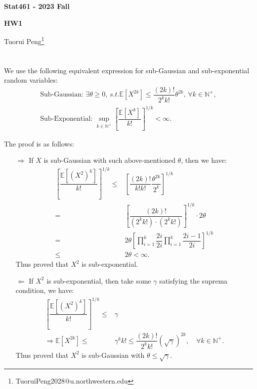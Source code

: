 \documentclass[11pt,a4paper]{ctexart}
\numberwithin{equation}{section}%
\begin{document}
\begin{center}\thispagestyle{plain}

{\LARGE\textbf{Stat461 - 2023 Fall}}

{\Large\textbf{HW1}}

Tuorui Peng\footnote{TuoruiPeng2028@u.northwestern.edu}
\end{center}

\thispagestyle{myheadings}
\pagestyle{myheadings}





  


\section{}
\subsection{}
We use the following equivalent expression for sub-Gaussian and sub-exponential random variables:
\begin{align*}
    \text{Sub-Gaussian: }\exists \theta \geq 0,\,s.t. \mathbb{E}\left[ X^{2k} \right] \leq \dfrac{ (2k)! }{ 2^kk! } \theta^{2k},\, \forall k \in \mathbb{N}^+,\\
    \text{Sub-Exponential: }\mathop{ \sup }\limits_{k\in\mathbb{N}^+} \left[\dfrac{ \mathbb{E}\left[ X^k  \right]  }{ k! } \right]^{1/k} < \infty .
\end{align*}

The proof is as follows:
\begin{itemize}[topsep=2pt,itemsep=0pt]
    \item[$ \Rightarrow $] If $ X $ is sub-Gaussian with such above-mentioned $ \theta $, then we have:
    \begin{align*}
        \left[\dfrac{ \mathbb{E}\left[ (X^2)^k  \right]  }{ k! } \right]^{1/k} \leq & \left[ \dfrac{ (2k)! }{  k!k! } \dfrac{ \theta ^{2k} }{ 2^k }   \right]^{1/k}\\
        =& \left[ \dfrac{ (2k)! }{ (2^kk!)\cdot (2^k k!) }  \right]^{1/k} \cdot 2\theta \\
        =& 2\theta \left[ \prod_{i=1}^k \dfrac{ 2i }{ 2i } \prod_{i=1}^k \dfrac{ 2i-1 }{ 2i }    \right]^{1/k}\\
        \leq & 2\theta  < \infty.
    \end{align*}
    Thus proved that $ X^2 $ is sub-exponential.
    \item[$ \Leftarrow $] If $ X^2 $ is sub-exponential, then take some $ \gamma  $ satisfying the suprema condition, we have:
    \begin{align*}
        \left[\dfrac{ \mathbb{E}\left[ (X^2)^k  \right]  }{ k! } \right]^{1/k} \leq& \gamma \\
         \Rightarrow  \mathbb{E}\left[ X^{2k} \right] \leq & \gamma ^k k! \leq \dfrac{ (2k)! }{ 2^kk! }(\sqrt{\gamma })^{2k},\quad \forall k \in \mathbb{N}^+.
    \end{align*}
    Thus proved that $ X^2 $ is sub-Gaussian with $ \theta \leq  \sqrt{\gamma } $.
\end{itemize}
\end{document}
